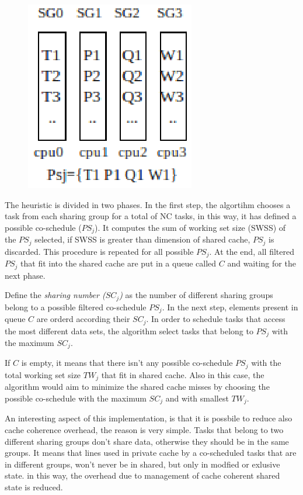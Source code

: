 \begin{description}
\begin{figure}[htbp]
\centering
\includegraphics[width=\widefigure]{images/possible_cosched.eps}
\caption{}
\label{fig:possible_cosched}
\end{figure}

The heuristic is divided in two phases. In the first step, the algortihm chooses a task from each sharing group for a total of NC tasks, in this way, it
has defined a possible co-schedule ($PS_j$). It computes the sum of working set size (SWSS) of the $PS_j$ selected, if SWSS is greater than dimension of 
shared cache, $PS_j$ is discarded. This procedure is repeated for all possible $PS_j$. At the end, all filtered $PS_j$ that fit into the shared cache are 
put in a queue called $C$ and waiting for the next phase.

Define the \textit{sharing number ($SC_j$)} as the number of different sharing groups belong to a possible filtered co-schedule $PS_j$. In the 
next step, elements present in queue $C$ are orderd according their $SC_j$. In order to schedule tasks that access the most different data sets, the 
algorithm select tasks that belong to $PS_j$ with the maximum $SC_j$.

If $C$ is empty, it means that there isn't any possible co-schedule $PS_j$ with the total working set size $TW_j$ that fit in shared cache. Also in this 
case, the algorithm would aim to minimize the shared cache misses by choosing the possible co-schedule with the maximum $SC_j$ and with smallest $TW_j$.

An interesting aspect of this implementation, is that it is possbile to reduce also cache coherence overhead, the reason is very simple. Tasks that belong 
to two different sharing groups don't share data, otherwise they should be in the same groups. It means that lines used in private cache by
a co-scheduled tasks that are in different groups, won't never be in shared, but only in modfied or exlusive state. in this way, the overhead due to 
management of cache coherent shared state is reduced. 


\end{description}
